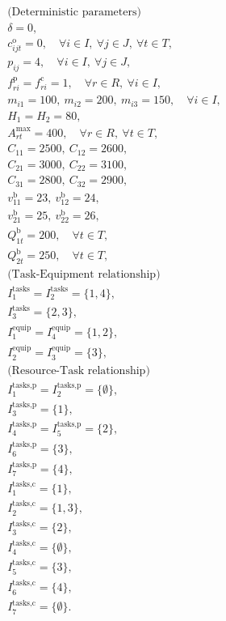 \begin{gather*}
\textrm{(Deterministic parameters)}\\
\delta=0,\\
c_{ijt}^\textrm{o}=0,\quad\forall i\in I,\ \forall j\in J,\ \forall t\in T,\\
p_{ij}=4,\quad\forall i\in I,\ \forall j\in J,\\
f_{ri}^\textrm{p}=f_{ri}^\textrm{c}=1,\quad\forall r\in R,\ \forall i\in I,\\
m_{i1}=100,\ m_{i2}=200,\ m_{i3}=150, \quad\forall i\in I,\\
H_1=H_2=80,\\
A_{rt}^\textrm{max}=400,\quad\forall r\in R,\ \forall t\in T,\\
C_{11}=2500,\ C_{12}=2600,\\
C_{21}=3000,\ C_{22}=3100,\\
C_{31}=2800,\ C_{32}=2900,\\
v_{11}^\textrm{b}=23,\ v_{12}^\textrm{b}=24,\\
v_{21}^\textrm{b}=25,\ v_{22}^\textrm{b}=26,\\
Q_{1t}^\textrm{b}=200,\quad\forall t\in T,\\
Q_{2t}^\textrm{b}=250,\quad\forall t\in T,\\
\textrm{(Task-Equipment relationship)}\\
I_1^\textrm{tasks}=I_2^\textrm{tasks}=\{1,4\},\\
I_3^\textrm{tasks}=\{2,3\},\\
I_1^\textrm{equip}=I_4^\textrm{equip}=\{1,2\},\\
I_2^\textrm{equip}=I_3^\textrm{equip}=\{3\},\\
\textrm{(Resource-Task relationship)}\\
I_1^\textrm{tasks,p}=I_2^\textrm{tasks,p}=\{\emptyset\},\\
I_3^\textrm{tasks,p}=\{1\},\\
I_4^\textrm{tasks,p}=I_5^\textrm{tasks,p}=\{2\},\\
I_6^\textrm{tasks,p}=\{3\},\\
I_7^\textrm{tasks,p}=\{4\},\\
I_1^\textrm{tasks,c}=\{1\},\\
I_2^\textrm{tasks,c}=\{1,3\},\\
I_3^\textrm{tasks,c}=\{2\},\\
I_4^\textrm{tasks,c}=\{\emptyset\},\\
I_5^\textrm{tasks,c}=\{3\},\\
I_6^\textrm{tasks,c}=\{4\},\\
I_7^\textrm{tasks,c}=\{\emptyset\}.
\end{gather*}


